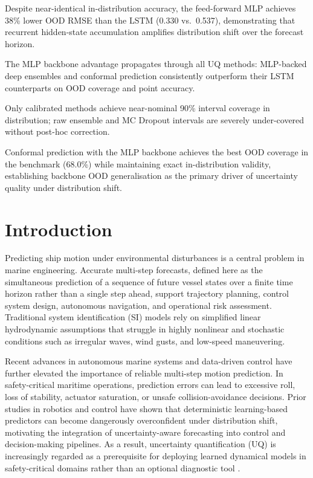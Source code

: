 \documentclass[a4paper,fleqn]{cas-sc}
\begin{document}
\begin{highlights}
\item Despite near-identical in-distribution accuracy, the feed-forward MLP achieves 38\% lower OOD RMSE than the LSTM (0.330 vs.\ 0.537), demonstrating that recurrent hidden-state accumulation amplifies distribution shift over the forecast horizon.
\item The MLP backbone advantage propagates through all UQ methods: MLP-backed deep ensembles and conformal prediction consistently outperform their LSTM counterparts on OOD coverage and point accuracy.
\item Only calibrated methods achieve near-nominal 90\% interval coverage in distribution; raw ensemble and MC Dropout intervals are severely under-covered without post-hoc correction.
\item Conformal prediction with the MLP backbone achieves the best OOD coverage in the benchmark (68.0\%) while maintaining exact in-distribution validity, establishing backbone OOD generalisation as the primary driver of uncertainty quality under distribution shift.
\end{highlights}
\maketitle

\section{Introduction}

Predicting ship motion under environmental disturbances is a central problem in marine engineering. Accurate multi-step forecasts, defined here as the simultaneous prediction of a sequence of future vessel states over a finite time horizon rather than a single step ahead, support trajectory planning, control system design, autonomous navigation, and operational risk assessment. Traditional system identification (SI) models rely on simplified linear hydrodynamic assumptions that struggle in highly nonlinear and stochastic conditions such as irregular waves, wind gusts, and low-speed maneuvering.

Recent advances in autonomous marine systems and data-driven control have further elevated the importance of reliable multi-step motion prediction. In safety-critical maritime operations, prediction errors can lead to excessive roll, loss of stability, actuator saturation, or unsafe collision-avoidance decisions. Prior studies in robotics and control have shown that deterministic learning-based predictors can become dangerously overconfident under distribution shift, motivating the integration of uncertainty-aware forecasting into control and decision-making pipelines. As a result, uncertainty quantification (UQ) is increasingly regarded as a prerequisite for deploying learned dynamical models in safety-critical domains rather than an optional diagnostic tool \cite{lakshminarayanan2017, gal2016dropout, ovadia2019can}.
\end{document}
